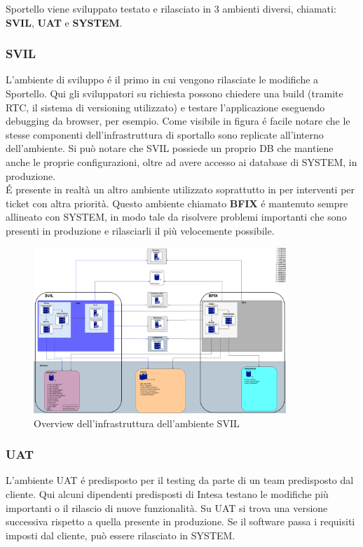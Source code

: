 Sportello viene sviluppato testato e rilasciato in 3 ambienti diversi, chiamati: \textbf{SVIL}, \textbf{UAT} e \textbf{SYSTEM}.

\subsubsection{SVIL}

L'ambiente di sviluppo é il primo in cui vengono rilasciate le modifiche a Sportello. Qui gli sviluppatori su richiesta possono chiedere una build (tramite RTC, il sistema di versioning utilizzato) e testare l'applicazione eseguendo debugging da browser, per esempio. Come visibile in figura é facile notare che le stesse componenti dell'infrastruttura di sportallo sono replicate all'interno dell'ambiente. Si può notare che SVIL possiede un proprio DB che mantiene anche le proprie configurazioni, oltre ad avere accesso ai database di SYSTEM, in produzione. \\
É presente in realtà un altro ambiente utilizzato soprattutto in per interventi per ticket con altra priorità. Questo ambiente chiamato \textbf{BFIX} é mantenuto sempre allineato con SYSTEM, in modo tale da risolvere problemi importanti che sono presenti in produzione e rilasciarli il più velocemente possibile. 


\begin{figure}[h!]
    \centering
	\includegraphics[width=0.85\textwidth]{./res/img/svil-diag.png}
    \caption{Overview dell'infrastruttura dell'ambiente SVIL}
\end{figure}

\subsubsection{UAT}

L'ambiente UAT é predisposto per il testing da parte di un team predisposto dal cliente. Qui alcuni dipendenti predisposti di Intesa testano le modifiche più importanti o il rilascio di nuove funzionalità. Su UAT si trova una versione successiva rispetto a quella presente in produzione. Se il software passa i requisiti imposti dal cliente, può essere rilasciato in SYSTEM.

